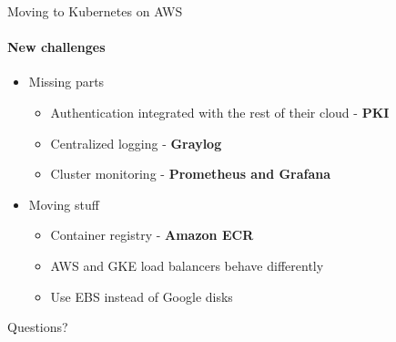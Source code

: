 \documentclass[14pt]{beamer}
\newcommand{\imageframe}[2]{{
  \usebackgroundtemplate{\texttt{[image: \#1]}}
  \begin{frame}{\vspace{-6pt}\usebeamercolor[fg]{item}\huge{#2}}
  \end{frame}
}}
\begin{document}
  \begin{frame}{Moving to Kubernetes on AWS}
  \framesubtitle{New challenges}
  \begin{itemize}
    \item Missing parts
    \begin{itemize}
      \item Authentication integrated with the rest of their cloud - \textbf{PKI}
      \item Centralized logging - \textbf{Graylog}
      \item Cluster monitoring - \textbf{Prometheus and Grafana}
    \end{itemize}
    \item Moving stuff
    \begin{itemize}
      \item Container registry - \textbf{Amazon ECR}
      \item AWS and GKE load balancers behave differently
      \item Use EBS instead of Google disks
    \end{itemize}
  \end{itemize}
  \end{frame}

  \imageframe{images/questions.jpg}{Questions?}
\end{document}
